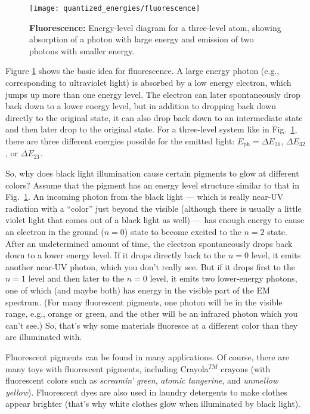 \begin{figure}
\begin{center}
\texttt{[image: quantized\_energies/fluorescence]}
\end{center}
\caption{{\bf Fluorescence: } Energy-level diagram for a 
three-level atom, showing
absorption of a photon with large energy and emission of two
photons with smaller energy. }
\label{fig:fluorescence}
\end{figure}
		
Figure \ref{fig:fluorescence} shows the basic idea for fluorescence.
A large energy photon (e.g., corresponding to ultraviolet light)
is absorbed by a low energy electron, which jumps up more than one
energy level.  The electron can later spontaneously drop back down to
a lower energy level, but in addition to dropping back down directly to
the original state, it can also drop back down to an intermediate state
and then later drop to the original state. For a three-level system
like in Fig.~\ref{fig:fluorescence}, there are three different energies
possible for the emitted light: $E_\text{ph} = \Delta E_{31}$, $\Delta E_{32}$,
or $\Delta E_{21}$.

So, why does black light illumination cause certain pigments to glow at
different colors?  Assume that the pigment has an energy level structure
similar to that in Fig.~\ref{fig:fluorescence}. An incoming photon from
the black light --- which is really near-UV radiation with a ``color''
just beyond the visible (although there is usually a little violet light
that comes out of a black light as well) --- has enough energy to cause an
electron in the ground ($n = 0$) state to become excited to the $n = 2$
state. After an undetermined amount of time, the electron spontaneously
drops back down to a lower energy level. If it drops directly back to
the $n = 0$ level, it emits another near-UV photon, which you don't
really see. But if it drops first to the $n = 1$ level and then later
to the $n = 0$ level, it emits two lower-energy photons, one of which
(and maybe both) has energy in the visible part of the EM spectrum.
(For many fluorescent pigments, one photon will be in the visible range,
e.g., orange or green, and the other will be an infrared photon which you
can't see.) So, that's why some materials fluoresce at a different
color than they are illuminated with.

Fluorescent pigments can be found in many applications. Of course,
there are many toys with fluorescent pigments, including Crayola$^{TM}$
crayons (with fluorescent colors such as {\it screamin' green}, {\it
atomic tangerine}, and {\it unmellow yellow}). Fluorescent dyes are also
used in laundry detergents to make clothes appear brighter (that's why
white clothes glow when illuminated by black light).

